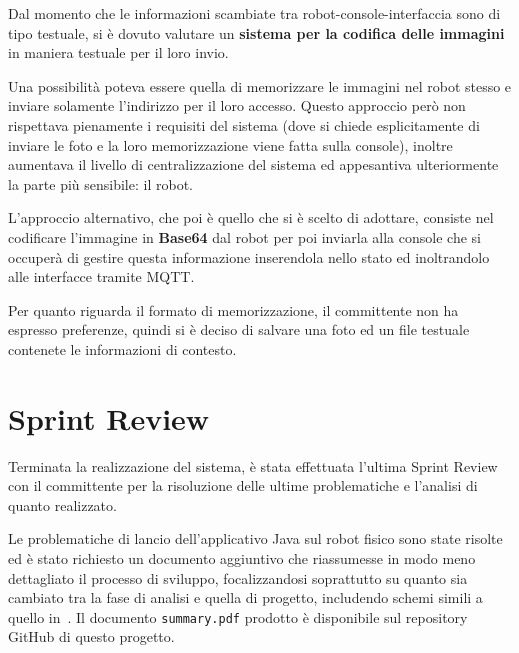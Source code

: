 Dal momento che le informazioni scambiate tra robot-console-interfaccia sono di tipo testuale, si è dovuto valutare un \textbf{sistema per la codifica delle immagini} in maniera testuale per il loro invio.

Una possibilità poteva essere quella di memorizzare le immagini nel robot stesso e inviare solamente l'indirizzo per il loro accesso.
Questo approccio però non rispettava pienamente i requisiti del sistema (dove si chiede esplicitamente di inviare le foto e la loro memorizzazione viene fatta sulla console), inoltre aumentava il livello di centralizzazione del sistema ed appesantiva ulteriormente la parte più sensibile: il robot.

L'approccio alternativo, che poi è quello che si è scelto di adottare, consiste nel codificare l'immagine in \textbf{Base64} dal robot per poi inviarla alla console che si occuperà di gestire questa informazione inserendola nello stato ed inoltrandolo alle interfacce tramite MQTT\@.

Per quanto riguarda il formato di memorizzazione, il committente non ha espresso preferenze, quindi si è deciso di salvare una foto ed un file testuale contenete le informazioni di contesto.

\section{Sprint Review}

Terminata la realizzazione del sistema, è stata effettuata l'ultima Sprint Review con il committente per la risoluzione delle ultime problematiche e l'analisi di quanto realizzato.

Le problematiche di lancio dell'applicativo Java sul robot fisico sono state risolte ed è stato richiesto un documento aggiuntivo che riassumesse in modo meno dettagliato il processo di sviluppo, focalizzandosi soprattutto su quanto sia cambiato tra la fase di analisi e quella di progetto, includendo schemi simili a quello in~.
Il documento \texttt{summary.pdf} prodotto è disponibile sul repository GitHub di questo progetto.
